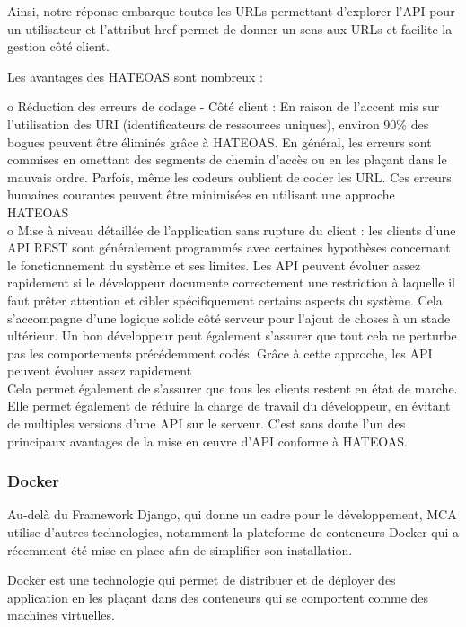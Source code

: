 Ainsi, notre réponse embarque toutes les URLs permettant d’explorer l’API pour un utilisateur 
et l’attribut href permet de donner un sens aux URLs et facilite la gestion côté client.
\pagebreak

Les avantages des HATEOAS sont nombreux : 

o	Réduction des erreurs de codage - Côté client : En raison de l'accent mis sur l'utilisation des URI 
(identificateurs de ressources uniques), environ 90\% des bogues peuvent être éliminés grâce à HATEOAS. 
En général, les erreurs sont commises en omettant des segments de chemin d'accès ou en les plaçant dans 
le mauvais ordre. Parfois, même les codeurs oublient de coder les URL. Ces erreurs humaines courantes peuvent
 être minimisées en utilisant une approche HATEOAS\\

o	Mise à niveau détaillée de l'application sans rupture du client : les clients d'une API REST sont 
généralement programmés avec certaines hypothèses concernant le fonctionnement du système et ses limites. 
Les API peuvent évoluer assez rapidement si le développeur documente correctement une restriction à laquelle 
il faut prêter attention et cibler spécifiquement certains aspects du système. Cela s'accompagne d'une 
logique solide côté serveur pour l'ajout de choses à un stade ultérieur. Un bon développeur peut également 
s'assurer que tout cela ne perturbe pas les comportements précédemment codés. Grâce à cette approche, les 
API peuvent évoluer assez rapidement\\

Cela permet également de s'assurer que tous les clients restent en état de marche. 
Elle permet également de réduire la charge de travail du développeur, en évitant de 
multiples versions d'une API sur le serveur. C'est sans doute l'un des principaux avantages 
de la mise en œuvre d'API conforme à HATEOAS.
\pagebreak

\subsubsection{Docker}
Au-delà du Framework Django, qui donne un cadre pour le développement, MCA utilise d’autres technologies, 
notamment la plateforme de conteneurs Docker qui a récemment été mise en place afin de simplifier son 
installation.

Docker est une technologie qui permet de distribuer et de déployer des application en les plaçant dans 
des conteneurs qui se comportent comme des machines virtuelles. 

